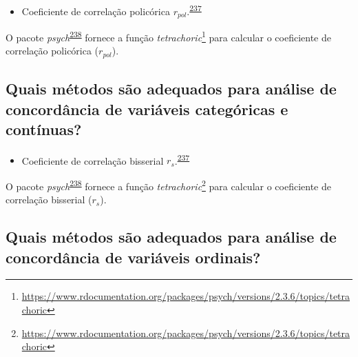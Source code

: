 \documentclass[
  a4paper,
]{book}
\providecommand{\tightlist}{%
  \setlength{\itemsep}{0pt}\setlength{\parskip}{0pt}}
\renewcommand{\href}[2]{#2\footnote{\url{#1}}}
\newenvironment{infobox}[1]
  {
  \begin{itemize}
  \renewcommand{\labelitemi}{
    \raisebox{-.7\height}[0pt][0pt]{
      {\setkeys{Gin}{width=3em,keepaspectratio}
        \texttt{[image: \#1]}}
    }
  }
  \setlength{\fboxsep}{1em}
  \begin{blackbox}
  \item
  }
  {
  \end{blackbox}
  \end{itemize}
  }
\begin{document}
\begin{itemize}
\tightlist
\item
  Coeficiente de correlação policórica \(r_{pol}\).\textsuperscript{\protect\hyperlink{ref-banerjee1999}{237}}
\end{itemize}

\begin{infobox}{images/Rlogo}
O pacote \emph{psych}\textsuperscript{\protect\hyperlink{ref-psych}{238}} fornece a função \href{https://www.rdocumentation.org/packages/psych/versions/2.3.6/topics/tetrachoric}{\emph{tetrachoric}} para calcular o coeficiente de correlação policórica (\(r_{pol}\)).

\end{infobox}

\hypertarget{quais-muxe9todos-suxe3o-adequados-para-anuxe1lise-de-concorduxe2ncia-de-variuxe1veis-categuxf3ricas-e-contuxednuas}{%
\subsection{Quais métodos são adequados para análise de concordância de variáveis categóricas e contínuas?}\label{quais-muxe9todos-suxe3o-adequados-para-anuxe1lise-de-concorduxe2ncia-de-variuxe1veis-categuxf3ricas-e-contuxednuas}}

\begin{itemize}
\tightlist
\item
  Coeficiente de correlação bisserial \(r_{s}\).\textsuperscript{\protect\hyperlink{ref-banerjee1999}{237}}
\end{itemize}

\begin{infobox}{images/Rlogo}
O pacote \emph{psych}\textsuperscript{\protect\hyperlink{ref-psych}{238}} fornece a função \href{https://www.rdocumentation.org/packages/psych/versions/2.3.6/topics/tetrachoric}{\emph{tetrachoric}} para calcular o coeficiente de correlação bisserial (\(r_{s}\)).

\end{infobox}

\hypertarget{quais-muxe9todos-suxe3o-adequados-para-anuxe1lise-de-concorduxe2ncia-de-variuxe1veis-ordinais}{%
\subsection{Quais métodos são adequados para análise de concordância de variáveis ordinais?}\label{quais-muxe9todos-suxe3o-adequados-para-anuxe1lise-de-concorduxe2ncia-de-variuxe1veis-ordinais}}
\end{document}
